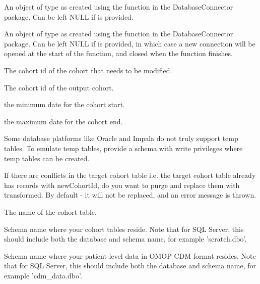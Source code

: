 \documentclass[a4paper]{book}
\begin{document}
\begin{Arguments}
\begin{ldescription}
\item[\code{connectionDetails}] An object of type  as created using the
 function in the
DatabaseConnector package. Can be left NULL if  is
provided.

\item[\code{connection}] An object of type  as created using the
 function in the
DatabaseConnector package. Can be left NULL if 
is provided, in which case a new connection will be opened at the start
of the function, and closed when the function finishes.

\item[\code{oldCohortId}] The cohort id of the cohort that needs to be modified.

\item[\code{newCohortId}] The cohort id of the output cohort.

\item[\code{cohortStartDateLeftCensor}] the minimum date for the cohort start.

\item[\code{cohortEndDateRightCensor}] the maximum date for the cohort end.

\item[\code{tempEmulationSchema}] Some database platforms like Oracle and Impala do not truly support
temp tables. To emulate temp tables, provide a schema with write
privileges where temp tables can be created.

\item[\code{purgeConflicts}] If there are conflicts in the target cohort table i.e. the target cohort table
already has records with newCohortId, do you want to purge and replace them
with transformed. By default - it will not be replaced, and an error message is thrown.

\item[\code{cohortTable}] The name of the cohort table.

\item[\code{cohortDatabaseSchema}] Schema name where your cohort tables reside. Note that for SQL Server,
this should include both the database and schema name, for example
'scratch.dbo'.

\item[\code{cdmDatabaseSchema}] Schema name where your patient-level data in OMOP CDM format resides.
Note that for SQL Server, this should include both the database and
schema name, for example 'cdm\_data.dbo'.
\end{ldescription}
\end{Arguments}
\end{document}
